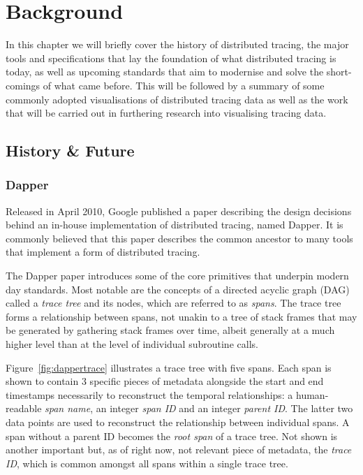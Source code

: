 \documentclass[12pt,pdftex,titlepage]{report}
\begin{document}
    \chapter{Background}
        \small{In this chapter we will briefly cover the history of distributed tracing, the major tools and specifications that lay the foundation of what distributed tracing is today,
        as well as upcoming standards that aim to modernise and solve the short-comings of what came before. This will be followed by a summary of some commonly adopted visualisations
        of distributed tracing data as well as the work that will be carried out in furthering research into visualising tracing data.}

        \section{History \& Future}
            \subsection{Dapper}
                Released in April 2010, Google published a paper describing the design decisions behind an in-house implementation 
                of distributed tracing, named Dapper. It is commonly believed that this paper describes the common ancestor to 
                many tools that implement a form of distributed tracing.

                The Dapper paper introduces some of the core primitives that underpin modern day standards. Most notable are the concepts
                of a directed acyclic graph (DAG) called a \textit{trace tree} and its nodes, which are referred to as \textit{spans}. 
                The trace tree forms a relationship between spans, not unakin to a tree of stack frames that may be generated by
                gathering stack frames over time, albeit generally at a much higher level than at the level of individual subroutine calls. 

                Figure~\ref{fig:dappertrace} illustrates a trace tree with five spans. Each span is shown to contain 3 specific pieces of
                metadata alongside the start and end timestamps necessarily to reconstruct the temporal relationships: a human-readable
                \textit{span name}, an integer \textit{span ID} and an integer \textit{parent ID}. The latter two
                data points are used to reconstruct the relationship between individual spans. A span without a parent ID becomes the 
                \textit{root span} of a trace tree. Not shown is another important but, as of right now, not relevant piece of metadata, the 
                \textit{trace ID}, which is common amongst all spans within a single trace tree.
\end{document}
